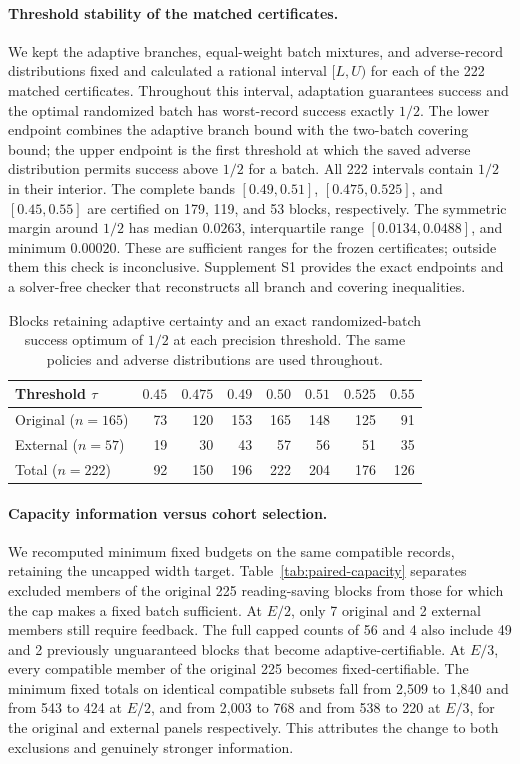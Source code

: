 \documentclass[12pt]{article}
\begin{document}
\paragraph{Threshold stability of the matched certificates.}
We kept the adaptive branches, equal-weight batch mixtures, and adverse-record
distributions fixed and calculated a rational interval $[L,U)$ for each of
the 222 matched certificates. Throughout this interval, adaptation guarantees
success and the optimal randomized batch has worst-record success exactly
$1/2$. The lower endpoint combines the adaptive branch bound with
the two-batch covering bound; the upper endpoint is the first threshold at
which the saved adverse distribution permits success above $1/2$ for a batch.
All 222 intervals contain $1/2$ in their interior. The complete bands
$[0.49,0.51]$, $[0.475,0.525]$, and $[0.45,0.55]$ are certified on 179, 119,
and 53 blocks, respectively. The symmetric margin around $1/2$ has median
$0.0263$, interquartile range $[0.0134,0.0488]$, and minimum $0.00020$.
These are sufficient ranges for the frozen certificates; outside them this
check is inconclusive. Supplement S1 provides the exact endpoints and a
solver-free checker that reconstructs all branch and covering inequalities.

\begin{table}[htbp]
\centering
\small
\caption{Blocks retaining adaptive certainty and an exact randomized-batch
success optimum of $1/2$ at each precision threshold. The same policies and
adverse distributions are used throughout.}
\label{tab:threshold-stability}
\begin{tabular}{lrrrrrrr}
\toprule
Threshold $\tau$ & $0.45$ & $0.475$ & $0.49$ & $0.50$ & $0.51$ & $0.525$ & $0.55$\\
\midrule
Original ($n=165$) & 73 & 120 & 153 & 165 & 148 & 125 & 91\\
External ($n=57$) & 19 & 30 & 43 & 57 & 56 & 51 & 35\\
Total ($n=222$) & 92 & 150 & 196 & 222 & 204 & 176 & 126\\
\bottomrule
\end{tabular}
\end{table}
\paragraph{Capacity information versus cohort selection.}
We recomputed minimum fixed budgets on the same compatible records, retaining
the uncapped width target. Table~\ref{tab:paired-capacity} separates excluded
members of the original 225 reading-saving blocks from those for which the
cap makes a fixed batch sufficient. At $E/2$, only 7 original and 2 external
members still require feedback. The full capped counts of 56 and 4 also
include 49 and 2 previously unguaranteed blocks that become adaptive-certifiable.
At $E/3$, every compatible member of the original 225 becomes fixed-certifiable.
The minimum fixed totals on identical compatible subsets fall from 2,509 to
1,840 and from 543 to 424 at $E/2$, and from 2,003 to 768 and from 538 to 220
at $E/3$, for the original and external panels respectively. This attributes
the change to both exclusions and genuinely stronger information.
\end{document}
